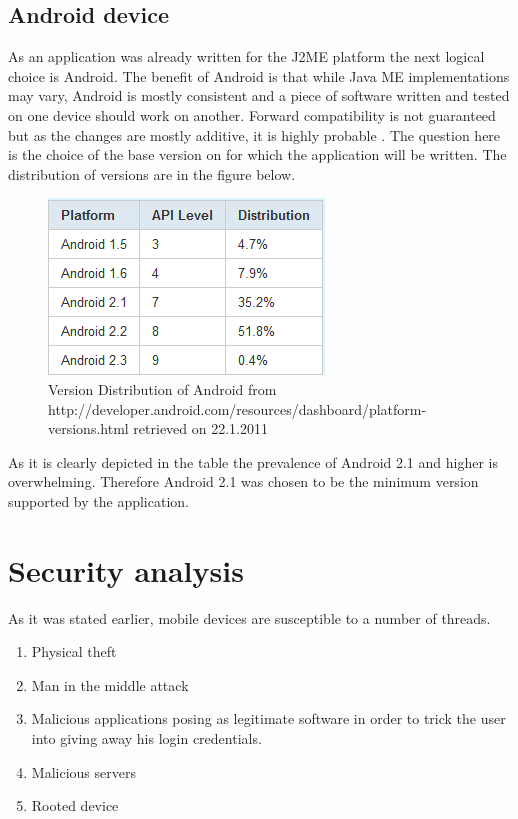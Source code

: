 \documentclass[11pt,twoside,a4paper]{book}
\begin{document}
\subsection{Android device}
 As an application was already written for the J2ME platform the next logical choice is Android. The benefit of Android\cite{whatisAnd} is that while Java ME implementations may vary, Android is mostly consistent and a piece of software written and tested on one device should work on another. Forward compatibility is not guaranteed but as the changes are mostly additive, it is highly probable \cite{goodevpi}.
 The question here is the choice of the base version on for which the application will be written. The distribution of versions are in the figure below.




\begin{figure}[h]
\begin{center}
\includegraphics[scale=1]{figures/VersionDistribution.PNG} 
\caption{Version Distribution of Android \cite{goodevver} from http://developer.android.com/resources/dashboard/platform-versions.html retrieved on 22.1.2011  }
\label{fig:versions}
\end{center}
\end{figure}


As it is clearly depicted in the table the prevalence of Android 2.1 and higher is overwhelming. Therefore Android 2.1 was chosen to be the minimum version supported by the application.
 	


\section{Security analysis}
\label{sec:security}

As it was stated earlier, mobile devices are susceptible to a number of threads. 
\begin{enumerate}
\item Physical theft
\item Man in the middle attack
\item Malicious applications posing as legitimate software in order to trick the user into giving away his login credentials.
\item Malicious servers %
\item Rooted device
\end{enumerate}
\end{document}
